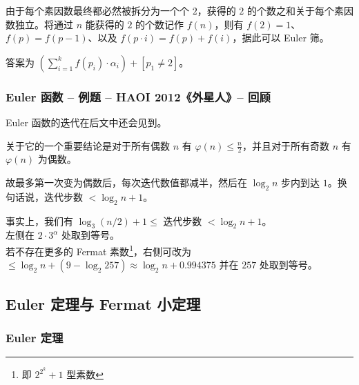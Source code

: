 \documentclass{../pkslide}
\begin{document}
\begin{structuregreen}
\begin{frame}
  \pause
  \emptyline
  由于每个素因数最终都必然被拆分为一个个 $2$，获得的 $2$ 的个数之和关于每个素因数独立。将通过 $n$ 能获得的 $2$ 的个数记作 $f(n)$，则有 $f(2) = 1$、$f(p) = f(p - 1)$、以及 $f(p \cdot i) = f(p) + f(i)$，据此可以 Euler 筛。
  
  \pause
  \emptyline
  答案为 $\displaystyle \left( \sum_{i = 1}^{k} f(p_i) \cdot \alpha_i \right) + [p_1 \ne 2]$。
\end{frame}

\begin{frame}
  \frametitle{Euler 函数 -- 例题 -- HAOI 2012《外星人》-- 回顾}
  Euler 函数的迭代在后文中还会见到。
  
  关于它的一个重要结论是对于所有偶数 $n$ 有 $\varphi(n) \le \frac{n}{2}$，并且对于所有奇数 $n$ 有 $\varphi(n)$ 为偶数。
  
  故最多第一次变为偶数后，每次迭代数值都减半，然后在 $\log_2 n$ 步内到达 $1$。换句话说，迭代步数 $< \log_2 n + 1$。
  
  \pause
  \emptyline
  事实上，我们有 $\log_3(n / 2) + 1 \le$ 迭代步数 $< \log_2 n + 1$。\\
  左侧在 $2 \cdot 3^\alpha$ 处取到等号。\\
  \pause
  若不存在更多的 Fermat 素数\footnote<3>{即 $2^{2^k} + 1$ 型素数}，右侧可改为 $\le \log_2 n + (9 - \log_2 257) \approx \log_2 n + 0.994375$ 并在 $257$ 处取到等号。
\end{frame}

\end{structuregreen}

\subsection{Euler 定理与 Fermat 小定理}
\subsubsection{Euler 定理}
\end{document}

